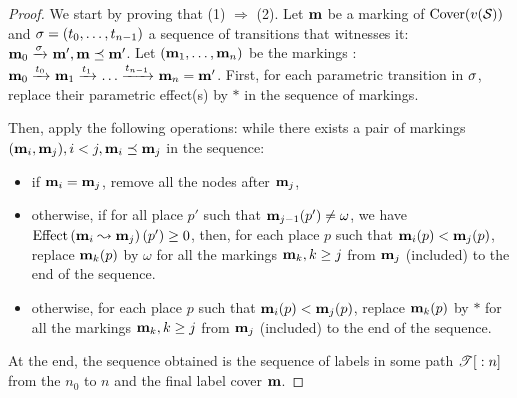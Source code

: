 \begin{proof}
  We start by proving that (1) $\Rightarrow$ (2).
  Let $\mathbf{m}$ be a marking of $\cover{\val[\namePPN]}$ and $\defSeqt{0}{n-1}$ a sequence of transitions that witnesses it:
  \(\mari \fire{\seqt} \mar', \mar \preceq \mar'\).
  Let $\bodySeqm{1}{n}$ be the markings : \(\mathbf{m}_0 \xrightarrow{t_0}_{} \mathbf{m}_1 \xrightarrow{t_1}_{} \dots \xrightarrow{t_{n-1}}_{} \mathbf{m}_n = \mathbf{m}'\).
  First, for each parametric transition in $\seqt$, replace their parametric effect(s) by $*$ in the sequence of markings.

  Then, apply the following operations:
  while there exists a pair of markings \((\mathbf{m}_i, \mathbf{m}_j), i < j, \mathbf{m}_i \preceq \mathbf{m}_j\) in the sequence:
  \begin{itemize}
    \item if $\mathbf{m}_i = \mathbf{m}_j$, remove all the nodes after $\mathbf{m}_j$,
    \item otherwise, if for all place $p'$ such that $\mathbf{m}_{j-1}(p') \neq \omega$, we have $\effect{\mpath{\mar_i}{\mar_j}}(p') \geq 0$, then, for each place $p$ such that $\mathbf{m}_i(p) < \mathbf{m}_j(p)$, replace $\mathbf{m}_k(p)$ by $\omega$ for all the markings $\mathbf{m}_k, k \geq j$ from $\mathbf{m}_j$ (included) to the end of the sequence.
    \item otherwise, for each place $p$ such that $\mathbf{m}_i(p) < \mathbf{m}_j(p)$, replace $\mathbf{m}_k(p)$ by $*$ for all the markings $\mathbf{m}_k, k \geq j$ from $\mathbf{m}_j$ (included) to the end of the sequence.
  \end{itemize}

  At the end, the sequence obtained is the sequence of labels in some path ${\mathscr{T}}[{}:{n}]$ from the $n_0$ to $n$ and the final label cover $\mathbf{m}$.


\end{proof}
